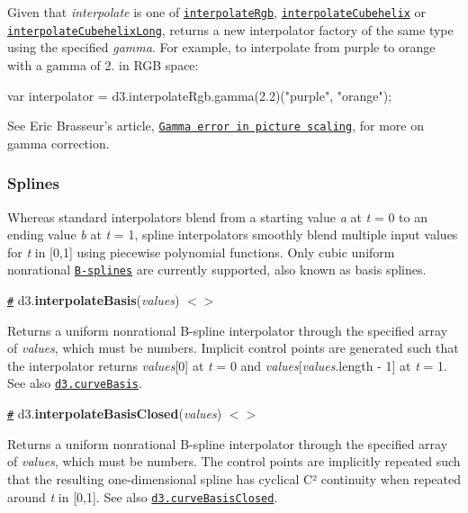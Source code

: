 Given that {\itshape interpolate} is one of \href{#interpolateRgb}{\tt interpolate\+Rgb}, \href{#interpolateCubehelix}{\tt interpolate\+Cubehelix} or \href{#interpolateCubehelixLong}{\tt interpolate\+Cubehelix\+Long}, returns a new interpolator factory of the same type using the specified {\itshape gamma}. For example, to interpolate from purple to orange with a gamma of 2. in R\+GB space\+:


\begin{DoxyCode}
var interpolator = d3.interpolateRgb.gamma(2.2)("purple", "orange");
\end{DoxyCode}


See Eric Brasseur’s article, \href{https://web.archive.org/web/20160112115812/http://www.4p8.com/eric.brasseur/gamma.html}{\tt Gamma error in picture scaling}, for more on gamma correction.

\subsubsection*{Splines}

Whereas standard interpolators blend from a starting value {\itshape a} at {\itshape t} = 0 to an ending value {\itshape b} at {\itshape t} = 1, spline interpolators smoothly blend multiple input values for {\itshape t} in \mbox{[}0,1\mbox{]} using piecewise polynomial functions. Only cubic uniform nonrational \href{https://en.wikipedia.org/wiki/B-spline}{\tt B-\/splines} are currently supported, also known as basis splines.

\href{#interpolateBasis}{\tt \#} d3.{\bfseries interpolate\+Basis}({\itshape values}) \href{https://github.com/d3/d3-interpolate/blob/master/src/basis.js}{\tt $<$$>$}

Returns a uniform nonrational B-\/spline interpolator through the specified array of {\itshape values}, which must be numbers. Implicit control points are generated such that the interpolator returns {\itshape values}\mbox{[}0\mbox{]} at {\itshape t} = 0 and {\itshape values}\mbox{[}{\itshape values}.length -\/ 1\mbox{]} at {\itshape t} = 1. See also \href{https://github.com/d3/d3-shape#curveBasis}{\tt d3.\+curve\+Basis}.

\href{#interpolateBasisClosed}{\tt \#} d3.{\bfseries interpolate\+Basis\+Closed}({\itshape values}) \href{https://github.com/d3/d3-interpolate/blob/master/src/basisClosed.js}{\tt $<$$>$}

Returns a uniform nonrational B-\/spline interpolator through the specified array of {\itshape values}, which must be numbers. The control points are implicitly repeated such that the resulting one-\/dimensional spline has cyclical C² continuity when repeated around {\itshape t} in \mbox{[}0,1\mbox{]}. See also \href{https://github.com/d3/d3-shape#curveBasisClosed}{\tt d3.\+curve\+Basis\+Closed}. 